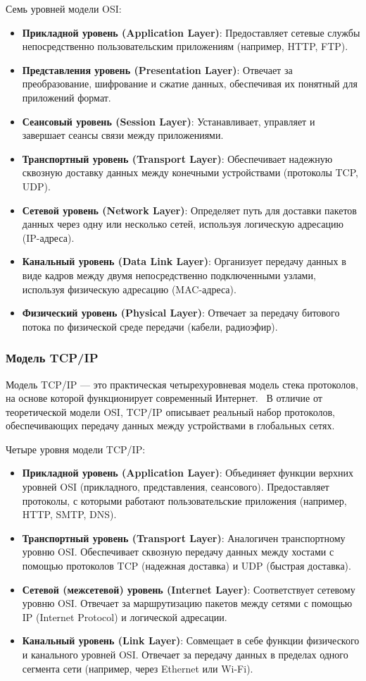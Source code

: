 Семь уровней модели OSI:
\begin{itemize}
    \item \textbf{Прикладной уровень (Application Layer)}: Предоставляет сетевые службы непосредственно пользовательским приложениям (например, HTTP, FTP).
    \item \textbf{Представления уровень (Presentation Layer)}: Отвечает за преобразование, шифрование и сжатие данных, обеспечивая их понятный для приложений формат.
    \item \textbf{Сеансовый уровень (Session Layer)}: Устанавливает, управляет и завершает сеансы связи между приложениями.
    \item \textbf{Транспортный уровень (Transport Layer)}: Обеспечивает надежную сквозную доставку данных между конечными устройствами (протоколы TCP, UDP).
    \item \textbf{Сетевой уровень (Network Layer)}: Определяет путь для доставки пакетов данных через одну или несколько сетей, используя логическую адресацию (IP-адреса).
    \item \textbf{Канальный уровень (Data Link Layer)}: Организует передачу данных в виде кадров между двумя непосредственно подключенными узлами, используя физическую адресацию (MAC-адреса).
    \item \textbf{Физический уровень (Physical Layer)}: Отвечает за передачу битового потока по физической среде передачи (кабели, радиоэфир).
\end{itemize}



\subsubsection{Модель TCP/IP}
Модель TCP/IP — это практическая четырехуровневая модель стека протоколов, на основе которой функционирует современный Интернет.~\cite{rfc1180}
В отличие от теоретической модели OSI, TCP/IP описывает реальный набор протоколов, обеспечивающих передачу данных между устройствами в глобальных сетях.

Четыре уровня модели TCP/IP:
\begin{itemize}
    \item \textbf{Прикладной уровень (Application Layer)}: Объединяет функции верхних уровней OSI (прикладного, представления, сеансового). Предоставляет протоколы, с которыми работают пользовательские приложения (например, HTTP, SMTP, DNS).
    \item \textbf{Транспортный уровень (Transport Layer)}: Аналогичен транспортному уровню OSI. Обеспечивает сквозную передачу данных между хостами с помощью протоколов TCP (надежная доставка) и UDP (быстрая доставка).
    \item \textbf{Сетевой (межсетевой) уровень (Internet Layer)}: Соответствует сетевому уровню OSI. Отвечает за маршрутизацию пакетов между сетями с помощью IP (Internet Protocol) и логической адресации.
    \item \textbf{Канальный уровень (Link Layer)}: Совмещает в себе функции физического и канального уровней OSI. Отвечает за передачу данных в пределах одного сегмента сети (например, через Ethernet или Wi-Fi).
\end{itemize}

